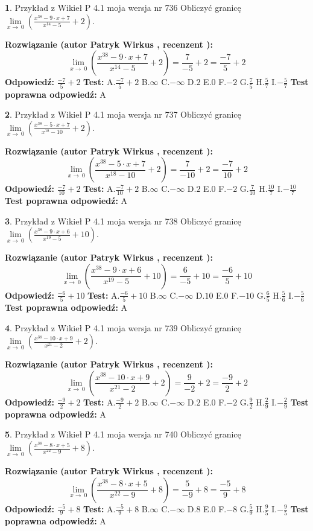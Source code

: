 \documentclass[12pt, a4paper]{article}
\theoremstyle{definition} %
\newtheorem{zad}{}
\newcommand{\zadStart}[1]{\begin{zad}#1\newline}
\newcommand{\zadStop}{\end{zad}}
\newcommand{\rozwStart}[2]{\noindent \textbf{Rozwiązanie (autor #1 , recenzent #2): }\newline}
\newcommand{\rozwStop}{\newline}
\newcommand{\odpStart}{\noindent \textbf{Odpowiedź:}\newline}
\newcommand{\odpStop}{\newline}
\newcommand{\testStart}{\noindent \textbf{Test:}\newline}
\newcommand{\testStop}{\newline}
\newcommand{\kluczStart}{\noindent \textbf{Test poprawna odpowiedź:}\newline}
\newcommand{\kluczStop}{\newline}
\begin{document}
\zadStart{Przykład z Wikieł P 4.1 moja wersja nr 736}
Obliczyć granicę $\lim\limits_{x\to\ 0}(\frac{x^{38}-9 \cdot x +7}{x^{14}-5}+2)$.
\zadStop
\rozwStart{Patryk Wirkus}{}
$$\lim\limits_{x\to\ 0}(\frac{x^{38}-9 \cdot x +7}{x^{14}-5}+2)=\frac{7}{-5}+2=\frac{-7}{5}+2$$
\rozwStop
\odpStart
$\frac{-7}{5}+2$
\odpStop
\testStart
A.$\frac{-7}{5}+2$
B.$\infty$
C.$-\infty$
D.$2$
E.$0$
F.$-2$
G.$\frac{7}{5}$
H.$\frac{5}{7}$
I.$-\frac{5}{7}$
\testStop
\kluczStart
A
\kluczStop



\zadStart{Przykład z Wikieł P 4.1 moja wersja nr 737}
Obliczyć granicę $\lim\limits_{x\to\ 0}(\frac{x^{38}-5 \cdot x +7}{x^{18}-10}+2)$.
\zadStop
\rozwStart{Patryk Wirkus}{}
$$\lim\limits_{x\to\ 0}(\frac{x^{38}-5 \cdot x +7}{x^{18}-10}+2)=\frac{7}{-10}+2=\frac{-7}{10}+2$$
\rozwStop
\odpStart
$\frac{-7}{10}+2$
\odpStop
\testStart
A.$\frac{-7}{10}+2$
B.$\infty$
C.$-\infty$
D.$2$
E.$0$
F.$-2$
G.$\frac{7}{10}$
H.$\frac{10}{7}$
I.$-\frac{10}{7}$
\testStop
\kluczStart
A
\kluczStop



\zadStart{Przykład z Wikieł P 4.1 moja wersja nr 738}
Obliczyć granicę $\lim\limits_{x\to\ 0}(\frac{x^{38}-9 \cdot x +6}{x^{19}-5}+10)$.
\zadStop
\rozwStart{Patryk Wirkus}{}
$$\lim\limits_{x\to\ 0}(\frac{x^{38}-9 \cdot x +6}{x^{19}-5}+10)=\frac{6}{-5}+10=\frac{-6}{5}+10$$
\rozwStop
\odpStart
$\frac{-6}{5}+10$
\odpStop
\testStart
A.$\frac{-6}{5}+10$
B.$\infty$
C.$-\infty$
D.$10$
E.$0$
F.$-10$
G.$\frac{6}{5}$
H.$\frac{5}{6}$
I.$-\frac{5}{6}$
\testStop
\kluczStart
A
\kluczStop



\zadStart{Przykład z Wikieł P 4.1 moja wersja nr 739}
Obliczyć granicę $\lim\limits_{x\to\ 0}(\frac{x^{38}-10 \cdot x +9}{x^{21}-2}+2)$.
\zadStop
\rozwStart{Patryk Wirkus}{}
$$\lim\limits_{x\to\ 0}(\frac{x^{38}-10 \cdot x +9}{x^{21}-2}+2)=\frac{9}{-2}+2=\frac{-9}{2}+2$$
\rozwStop
\odpStart
$\frac{-9}{2}+2$
\odpStop
\testStart
A.$\frac{-9}{2}+2$
B.$\infty$
C.$-\infty$
D.$2$
E.$0$
F.$-2$
G.$\frac{9}{2}$
H.$\frac{2}{9}$
I.$-\frac{2}{9}$
\testStop
\kluczStart
A
\kluczStop



\zadStart{Przykład z Wikieł P 4.1 moja wersja nr 740}
Obliczyć granicę $\lim\limits_{x\to\ 0}(\frac{x^{38}-8 \cdot x +5}{x^{22}-9}+8)$.
\zadStop
\rozwStart{Patryk Wirkus}{}
$$\lim\limits_{x\to\ 0}(\frac{x^{38}-8 \cdot x +5}{x^{22}-9}+8)=\frac{5}{-9}+8=\frac{-5}{9}+8$$
\rozwStop
\odpStart
$\frac{-5}{9}+8$
\odpStop
\testStart
A.$\frac{-5}{9}+8$
B.$\infty$
C.$-\infty$
D.$8$
E.$0$
F.$-8$
G.$\frac{5}{9}$
H.$\frac{9}{5}$
I.$-\frac{9}{5}$
\testStop
\kluczStart
A
\kluczStop
\end{document}
